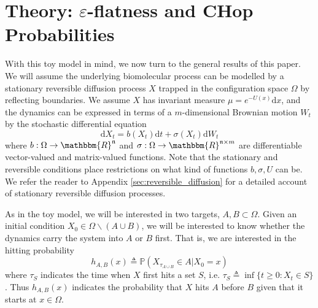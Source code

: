 \documentclass[english, aip, jcp, priprint, graphicx,floatfix]{revtex4-1}
\theoremstyle{plain}
\theoremstyle{definition}
\theoremstyle{plain}
\newcommand{\dimension}{{\mathfrak{n}}}
\begin{document}
\section{Theory: $\varepsilon$-flatness and CHop Probabilities}\label{sec:model_formulation}

With this toy model in mind, we now turn to the general results of this paper. We will assume the underlying biomolecular process can be modelled by a stationary reversible diffusion process $X$ trapped in the configuration space $\Omega$ by reflecting boundaries.  We assume $X$ has invariant
measure ${\mu}= e^{- U (x)} \mathrm{d} x$, and the dynamics can be expressed in terms of a $m$-dimensional Brownian motion $W_t$ by the stochastic differential equation
\begin{equation}\label{equ:general_sde}\mathrm{d} X_t = b (X_t) \mathrm{d} t + \sigma (X_t) \mathrm{d} W_t \end{equation}
where $b: \Omega \rightarrow \mathbbm{R}^\dimension$ and $\sigma :
\Omega \rightarrow \mathbbm{R}^{\dimension \times m}$ are differentiable vector-valued
and matrix-valued functions.  Note that the stationary and reversible conditions place restrictions on what kind of functions $b,\sigma,U$ can be.  We refer the reader to Appendix \ref{sec:reversible_diffusion} for a detailed account of stationary reversible diffusion processes.

As in the toy model, we will be interested in two targets, $A,B\subset \Omega$.  Given an initial condition $X_0\in \Omega \backslash (A\cup B)$, we will be interested to know whether the dynamics carry the system into $A$ or $B$ first.  That is, we are interested in the hitting probability
\[ h_{A, B}(x) \triangleq \mathbb{P}(X_{\tau_{A\cup B}}\in A|X_0=x)\]
where $\tau_S$ indicates the time when $X$ first hits a set $S$, i.e. $\tau_S \triangleq \inf \{ t \geqslant 0 : X_t \in S \}$.  Thus $h_{A,B}(x)$ indicates the probability that $X$ hits $A$ before $B$ given that it starts at $x\in\Omega$. 
\end{document}
